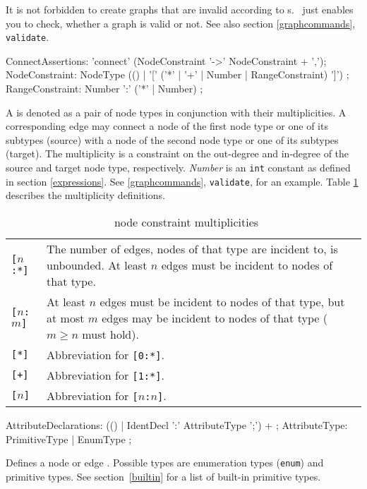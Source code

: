 \begin{note}
It is not forbidden to create graphs that are invalid according to s. \GrG\ just enables you to check, whether a graph is valid or not. See also section \ref{graphcommands}, \texttt{validate}.
\end{note}

\begin{rail}  
  ConnectAssertions: 'connect' (NodeConstraint '->' NodeConstraint + ',');
  NodeConstraint: NodeType (() | '[' ('*' | '+' | Number | RangeConstraint) ']') ;
  RangeConstraint: Number ':' ('*' | Number) ;
\end{rail}
A  is denoted as a pair of node types in conjunction with their multiplicities. A corresponding edge may connect a node of the first node type or one of its subtypes (source) with a node of the second node type or one of its subtypes (target). The multiplicity is a constraint on the out-degree and in-degree of the source and target node type, respectively. \emph{Number} is an \texttt{int} constant as defined in section \ref{expressions}. See \ref{graphcommands}, \texttt{validate}, for an example. Table \ref{multiplicities} describes the multiplicity definitions.
\begin{table}[htbp]
\begin{tabularx}{\linewidth}{|l|X|}\hline
	\texttt{[$n$:*]} & The number of edges, nodes of that type are incident to, is unbounded. At least $n$ edges must be incident to nodes of that type.\\ 
	\texttt{[$n$:$m$]} & At least $n$ edges must be incident to nodes of that type, but at most $m$ edges may be incident to nodes of that type ($m \geq n$ must hold).\\
	\texttt{[*]} & Abbreviation for \texttt{[0:*]}.\\
	\texttt{[+]} & Abbreviation for \texttt{[1:*]}.\\
	\texttt{[$n$]} & Abbreviation for \texttt{[$n$:$n$]}. \\ \hline
\end{tabularx}
\caption{\GrG\ node constraint multiplicities}
\label{multiplicities}
\end{table}

\begin{rail}    
  AttributeDeclarations: (() | IdentDecl ':' AttributeType ';') + ;
  AttributeType: PrimitiveType | EnumType ; 
\end{rail}
Defines a node or edge . Possible types are enumeration types (\texttt{enum}) and primitive types. See section~\ref{builtin} for a list of built-in primitive types.



